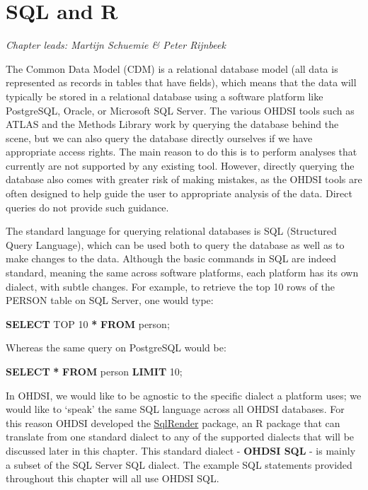 \documentclass[11pt]{book}
\newenvironment{Shaded}{\begin{snugshade}}{\end{snugshade}}
\newcommand{\DecValTok}[1]{\textcolor[rgb]{0.00,0.00,0.81}{#1}}
\newcommand{\KeywordTok}[1]{\textcolor[rgb]{0.13,0.29,0.53}{\textbf{#1}}}
\newcommand{\NormalTok}[1]{#1}
\newcommand{\OperatorTok}[1]{\textcolor[rgb]{0.81,0.36,0.00}{\textbf{#1}}}
\theoremstyle{definition}
\theoremstyle{definition}
\theoremstyle{definition}
\theoremstyle{remark}
\begin{document}
\hypertarget{SqlAndR}{%
\chapter{SQL and R}\label{SqlAndR}}

\emph{Chapter leads: Martijn Schuemie \& Peter Rijnbeek}

The Common Data Model (CDM) is a relational database model (all data is represented as records in tables that have fields), which means that the data will typically be stored in a relational database using a software platform like PostgreSQL, Oracle, or Microsoft SQL Server. The various OHDSI tools such as ATLAS and the Methods Library work by querying the database behind the scene, but we can also query the database directly ourselves if we have appropriate access rights. The main reason to do this is to perform analyses that currently are not supported by any existing tool. However, directly querying the database also comes with greater risk of making mistakes, as the OHDSI tools are often designed to help guide the user to appropriate analysis of the data. Direct queries do not provide such guidance.

The standard language for querying relational databases is SQL (Structured Query Language), which can be used both to query the database as well as to make changes to the data. Although the basic commands in SQL are indeed standard, meaning the same across software platforms, each platform has its own dialect, with subtle changes. For example, to retrieve the top 10 rows of the PERSON table on SQL Server, one would type:  

\begin{Shaded}
\begin{Highlighting}[]
\KeywordTok{SELECT}\NormalTok{ TOP }\DecValTok{10} \OperatorTok{*} \KeywordTok{FROM}\NormalTok{ person;}
\end{Highlighting}
\end{Shaded}

Whereas the same query on PostgreSQL would be:

\begin{Shaded}
\begin{Highlighting}[]
\KeywordTok{SELECT} \OperatorTok{*} \KeywordTok{FROM}\NormalTok{ person }\KeywordTok{LIMIT} \DecValTok{10}\NormalTok{;}
\end{Highlighting}
\end{Shaded}

In OHDSI, we would like to be agnostic to the specific dialect a platform uses; we would like to `speak' the same SQL language across all OHDSI databases. For this reason OHDSI developed the \href{https://ohdsi.github.io/SqlRender/}{SqlRender} package, an R package that can translate from one standard dialect to any of the supported dialects that will be discussed later in this chapter. This standard dialect - \textbf{OHDSI SQL} - is mainly a subset of the SQL Server SQL dialect. The example SQL statements provided throughout this chapter will all use OHDSI SQL.    
\end{document}
